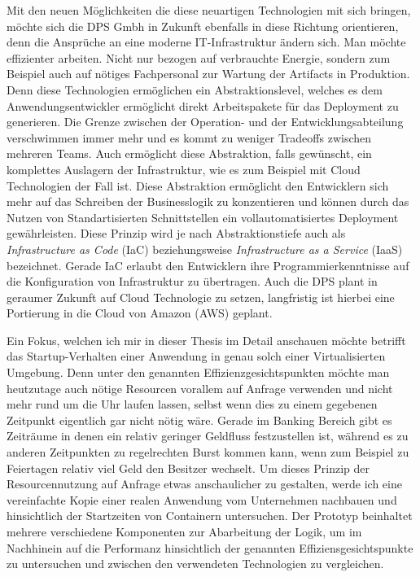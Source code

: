 Mit den neuen Möglichkeiten die diese neuartigen Technologien mit sich bringen, möchte sich die DPS Gmbh in Zukunft ebenfalls in diese Richtung orientieren, denn die Ansprüche an eine moderne IT-Infrastruktur ändern sich. Man möchte effizienter arbeiten. Nicht nur bezogen auf verbrauchte Energie, sondern zum Beispiel auch auf nötiges Fachpersonal zur Wartung der Artifacts in Produktion. Denn diese Technologien ermöglichen ein Abstraktionslevel, welches es dem Anwendungsentwickler ermöglicht direkt Arbeitspakete für das Deployment zu generieren. Die Grenze zwischen der Operation- und der Entwicklungsabteilung verschwimmen immer mehr und es kommt zu weniger Tradeoffs zwischen mehreren Teams. Auch ermöglicht diese Abstraktion, falls gewünscht, ein komplettes Auslagern der Infrastruktur, wie es zum Beispiel mit Cloud Technologien der Fall ist. Diese Abstraktion ermöglicht den Entwicklern sich mehr auf das Schreiben der Businesslogik zu konzentieren und können durch das Nutzen von Standartisierten Schnittstellen ein vollautomatisiertes Deployment gewährleisten. Diese Prinzip wird je nach Abstraktionstiefe auch als \emph{Infrastructure as Code} (IaC) beziehungsweise \emph{Infrastructure as a Service} (IaaS) bezeichnet. Gerade IaC erlaubt den Entwicklern ihre Programmierkenntnisse auf die Konfiguration von Infrastruktur zu übertragen. Auch die DPS plant in geraumer Zukunft auf Cloud Technologie zu setzen, langfristig ist hierbei eine Portierung in die Cloud von Amazon (AWS) geplant. 

Ein Fokus, welchen ich mir in dieser Thesis im Detail anschauen möchte betrifft das Startup-Verhalten einer Anwendung in genau solch einer Virtualisierten Umgebung. Denn unter den genannten Effizienzgesichtspunkten möchte man heutzutage auch nötige Resourcen vorallem auf Anfrage verwenden und nicht mehr rund um die Uhr laufen lassen, selbst wenn dies zu einem gegebenen Zeitpunkt eigentlich gar nicht nötig wäre. Gerade im Banking Bereich gibt es Zeiträume in denen ein relativ geringer Geldfluss festzustellen ist, während es zu anderen Zeitpunkten zu regelrechten Burst kommen kann, wenn zum Beispiel zu Feiertagen relativ viel Geld den Besitzer wechselt. Um dieses Prinzip der Resourcennutzung auf Anfrage etwas anschaulicher zu gestalten, werde ich eine vereinfachte Kopie einer realen Anwendung vom Unternehmen nachbauen und hinsichtlich der Startzeiten von Containern untersuchen. Der Prototyp beinhaltet mehrere verschiedene Komponenten zur Abarbeitung der Logik, um im Nachhinein auf die Performanz hinsichtlich der genannten Effiziensgesichtspunkte zu untersuchen und zwischen den verwendeten Technologien zu vergleichen.

